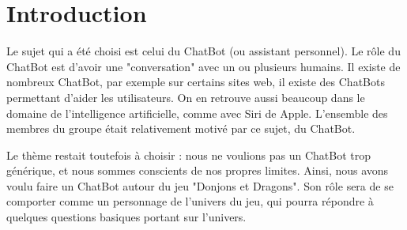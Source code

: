 	\section{Introduction}

Le sujet qui a été choisi est celui du ChatBot (ou assistant personnel). Le rôle du ChatBot est d'avoir une "conversation" avec un ou plusieurs humains. Il existe de nombreux ChatBot, par exemple sur certains sites web, il existe des ChatBots permettant d'aider les utilisateurs. On en retrouve aussi beaucoup dans le domaine de l'intelligence artificielle, comme avec Siri de Apple. L’ensemble des membres du groupe était relativement motivé par ce sujet, du ChatBot. 

Le thème restait toutefois à choisir : nous ne voulions pas un ChatBot trop générique, et nous sommes conscients de nos propres limites. Ainsi, nous avons voulu faire un ChatBot autour du jeu "Donjons et Dragons". Son rôle sera de se comporter comme un personnage de l'univers du jeu, qui pourra répondre à quelques questions basiques portant sur l'univers.